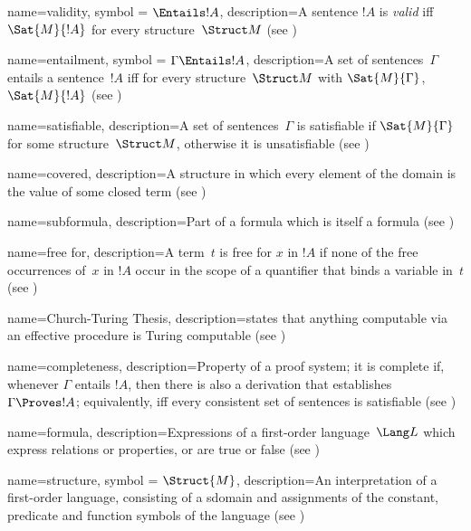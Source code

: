  {
  name=validity,
  symbol = {\ensuremath{\Entails !A}},
  description={A sentence $!A$ is \emph{valid}  iff
    $\Sat{M}{!A}$ for every \gls{structure}~$\Struct M$ (see
    )} }

 {
  name=entailment,
  symbol = {\ensuremath{\Gamma \Entails !A}},
  description={A set of sentences~$\Gamma$ entails a
    sentence~$!A$ iff for every
    \gls{structure}~$\Struct M$ with $\Sat{M}{\Gamma}$, $\Sat{M}{!A}$
    (see )} }

 {
  name=satisfiable,
  description={A set of sentences~$\Gamma$ is satisfiable if
    $\Sat{M}{\Gamma}$ for some \gls{structure}~$\Struct M$, otherwise it
    is unsatisfiable (see )} }

 {
    name=covered,    
    description={A \gls{structure} in which every element of the
      domain is the {value} of some closed term (see
      )} }

 {
  name={subformula},  
  description={Part of a formula which is itself a formula (see
    )} }

 {
  name=free for,
  description={A term~$t$ is {free for} $x$ in $!A$ if none
    of the \gls{free} occurrences of~$x$ in $!A$ occur in the scope of a
    quantifier that binds a variable in~$t$ (see
    )} }

 {
  name=Church-Turing Thesis,
  description={states that anything computable via an effective
    procedure is Turing computable (see )} }

 {
  name=completeness, 
  description={Property of a proof system; it is complete if, whenever
    $\Gamma$ entails $!A$, then there is also a {derivation} that
    establishes $\Gamma \Proves !A$; equivalently, iff
    every \gls{consistent} set of sentences is \gls{satisfiable}
    (see )} }

 {
  name={formula},  
  description={Expressions of a first-order language~$\Lang L$ which
    express relations or properties, or are true or false (see
    )} }

 {
  name={structure},
  symbol = {\ensuremath{\Struct{M}}},
  description={An interpretation of a first-order language, consisting
    of a \gls{sdomain} and assignments of the constant,
    predicate and function symbols of the language (see
    )} }

